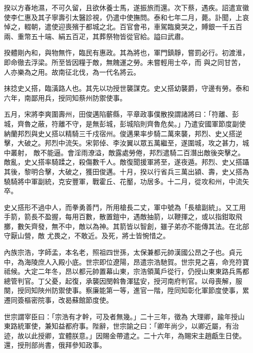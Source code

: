 \begin{pinyinscope}
 揆以方春地濕，不可久留，且欲休養士馬，遂振旅而還。次下蔡，遇疾。詔遣宣徽使李仁惠及其子寧壽引太醫診視，仍遣中使撫問。泰和七年二月，薨。訃聞，上哀悼之，輟朝，遣使迎喪殯于都城之北。百官會弔，車駕臨奠哭之，賻銀一千五百兩、重幣五十端、絹五百疋，其葬祭物皆從官給。謚曰武肅。



 揆體剛內和，與物無忤，臨民有惠政。其為將也，軍門鎮靜，嘗罰必行。初渡淮，即命徹去浮梁。所至皆因糧于敵，無餽運之勞。未嘗輕用士卒，而
 與之同甘苦，人亦樂為之用。故南征北伐，為一代名將云。



 抹捻史乂搭，臨潢路人也。其先以功授世襲謀克。史乂搭幼襲爵，守邊有勞。泰和六年，南鄙用兵，授同知蔡州防禦使事。



 五月，宋將李爽圍壽州，田俊邁陷蘄縣，平章政事僕散揆謂諸將曰：「符離、彭城，齊魯之蔽，符離不守，是無彭城，彭城陷則齊魯危矣。」乃遣安國軍節度副使納蘭邦烈與史乂搭以精騎三千戍宿州。俊邁果率步騎二萬來襲，邦烈、史乂搭逆擊，大破之。邦烈中流矢。宋郭倬、李汝翼以眾五萬繼至，遂圍城，攻之甚力，城中叢射，
 敵不能逼。會淫雨潦溢，敵露處勞倦，邦烈遣騎二百潛出敵後突擊之。敵亂，史乂搭率騎蹂之，殺傷數千人。敵復聞援軍將至，遂夜遁。邦烈、史乂搭躡其後，黎明合擊，大破之，獲田俊邁。十月，揆以行省兵三萬出潁、壽，史乂搭為驍騎將中軍副統，克安豐軍，戰霍丘、花靨，功居多。十二月，從攻和州，中流矢卒。



 史乂搭形不過中人，而拳勇善鬥，所用槍長二丈，軍中號為「長槍副統」。又工用手箭，箭長不盈握，每用百數，散置鎧中，遇敵抽箭，以鞭揮之，或以指鉗取飛擲，數矢齊發，無不中，敵以為神。其箭皆以智創，雖子弟亦不能傳其法。在北部守厭山營，敵
 尤畏之，不敢近。及死，將士皆惋惜之。



 內族宗浩，字師孟，本名老，照祖四世孫，太保兼都元帥漢國公昂之子也。貞元中，為海陵庶人入殿小底。世宗即位遼陽，昂遣宗浩馳賀。世宗見之喜，命充符寶祗候。大定二年冬，昂以都元帥置幕山東，宗浩領萬戶從行，仍授山東東路兵馬都總管判官。丁父憂，起復，承襲因閔斡魯渾猛安，授河南府判官。以母喪解，服闋，授同知陜州防禦使事。察廉能第一等，進官一階，陞同知彰化軍節度使事，累遷同簽樞密院事，改曷蘇館節度使。



 世宗謂宰臣曰：「宗浩有才幹，可及者無幾。」二十三年，徵為
 大理卿，踰年授山東路統軍使，兼知益都府事。陛辭，世宗諭之曰：「卿年尚少，以卿近屬，有治迹，故以此授卿，宜體朕意。」因賜金帶遣之。二十六年，為賜宋主趙甗生日使。還，授刑部尚書，俄拜參知政事。




\end{pinyinscope}
